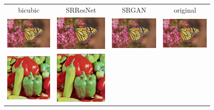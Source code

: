 \documentclass[10pt,twocolumn,letterpaper]{article}
\begin{document}
\begin{figure}[h!] 
  	\begin{tabular}{cccc}
  		 bicubic & SRResNet & SRGAN & original \\
     	\includegraphics[width=1.5in]{images/used/appendix/jpg/Set14/monarch_bicubic}&
     	\includegraphics[width=1.5in]{images/used/appendix/jpg/Set14/monarch_SRResNet-MSE} &
     	\includegraphics[width=1.5in]{images/used/appendix/jpg/Set14/monarch_SRGAN-VGG54} &
     	\includegraphics[width=1.5in]{images/used/appendix/jpg/Set14/monarch_HR} \\     	
     	\includegraphics[width=1.5in]{images/used/appendix/jpg/Set14/pepper_bicubic}&
     	\includegraphics[width=1.5in]{images/used/appendix/jpg/Set14/pepper_SRResNet-MSE} &

\end{tabular}
\end{figure}
\end{document}
